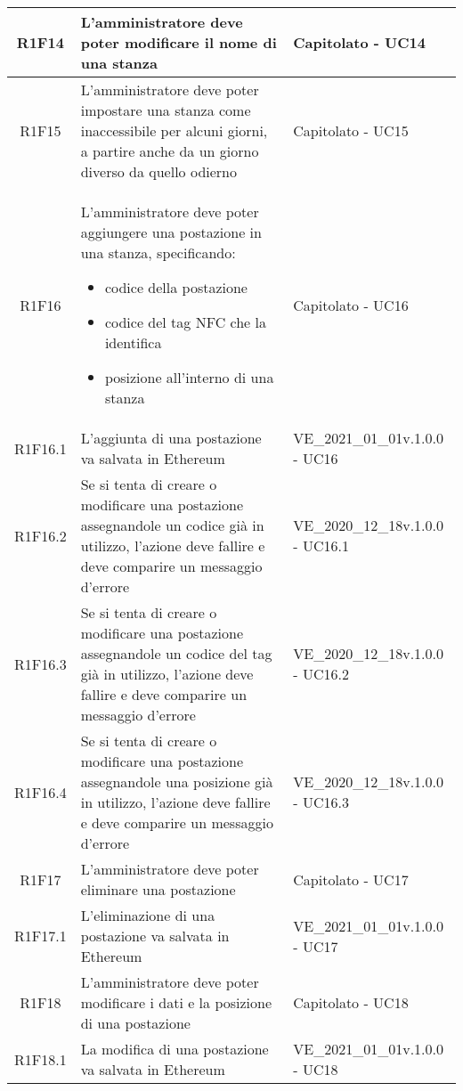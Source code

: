 \begin{center}
\begin{longtable}{|c|p{10cm}|p{4cm}|}
		\hline
		R1F14&L'amministratore deve poter modificare il nome di una stanza	& Capitolato - UC14	\\
		\hline
		R1F15&L'amministratore deve poter impostare una stanza come inaccessibile per alcuni giorni, a partire anche da un giorno diverso da quello odierno	& Capitolato - UC15	\\
		\hline
		R1F16&L'amministratore deve poter aggiungere una postazione in una stanza, specificando:
		\begin{itemize}
			\item codice della postazione
			\item codice del tag NFC che la identifica
			\item posizione all'interno di una stanza
		\end{itemize} & Capitolato - UC16	\\
		\hline
		R1F16.1&L'aggiunta di una postazione va salvata in Ethereum	&VE\_2021\_01\_01v.1.0.0 - UC16 	\\
		\hline
		R1F16.2&	Se si tenta di creare o modificare una postazione assegnandole un codice già in utilizzo, l'azione deve fallire e deve comparire un messaggio d'errore& VE\_2020\_12\_18v.1.0.0 - UC16.1 	\\
		\hline
		R1F16.3&Se si tenta di creare o modificare una postazione assegnandole un codice del tag già in utilizzo, l'azione deve fallire e deve comparire un messaggio d'errore	&VE\_2020\_12\_18v.1.0.0 - UC16.2 	\\
		\hline
		R1F16.4&Se si tenta di creare o modificare una postazione assegnandole una posizione già in utilizzo, l'azione deve fallire e deve comparire un messaggio d'errore	&VE\_2020\_12\_18v.1.0.0 - UC16.3 	\\
		\hline
		R1F17&L'amministratore deve poter eliminare una postazione	& Capitolato - UC17	\\
		\hline
		R1F17.1	&L'eliminazione di una postazione va salvata in Ethereum	& VE\_2021\_01\_01v.1.0.0 - UC17	\\
		\hline
		R1F18&L'amministratore deve poter modificare i dati e la posizione di una postazione	& Capitolato - UC18	\\
		\hline
		R1F18.1&	La modifica di una postazione va salvata in Ethereum& VE\_2021\_01\_01v.1.0.0 - UC18	\\
		\hline
		

\end{longtable}
\end{center}
